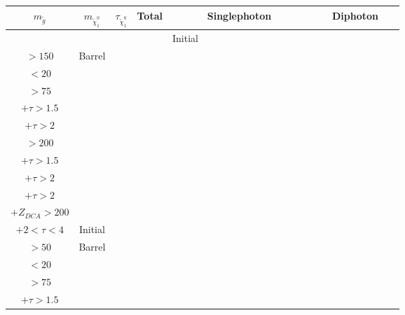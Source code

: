 \documentclass[8pt]{extarticle}
\begin{document}
\begin{longtable}{|c|c|c|c|c|c|c|c|c|c|c|c|c|c|c|c|c|c|c|c|c|c|c|c|c|}
\hline 
$m_{\tilde{g}}$ & $m_{\tilde{\chi}_1^0}$ & $\tau_{\tilde{\chi}_1^0}$ & Total & \multicolumn{12}{|c|}{Singlephoton} & \multicolumn{9}{|c|}{Diphoton} \\ 
\hline 
 & & & & Initial & \begin{tabular}{@{}c@{}} $p_T$ \\ $> 150$\end{tabular} & Barrel & \begin{tabular}{@{}c@{}} $E_T^{miss}$ \\ $< 20$\end{tabular} & \begin{tabular}{@{}c@{}} $E_T^{miss}$ \\ $> 75$\end{tabular} & \begin{tabular}{@{}c@{}} $E_T^{miss} > 75$ \\ $+ \tau > 1.5$ \end{tabular} & \begin{tabular}{@{}c@{}} $E_T^{miss} > 75$ \\ $+ \tau > 2$ \end{tabular} & \begin{tabular}{@{}c@{}} $E_T^{miss}$ \\ $> 200$\end{tabular} & \begin{tabular}{@{}c@{}} $E_T^{miss} > 200$ \\ $+ \tau > 1.5$ \end{tabular} & \begin{tabular}{@{}c@{}} $E_T^{miss} > 200$ \\ $+ \tau > 2$ \end{tabular} & \begin{tabular}{@{}c@{}} $E_T^{miss} > 200$ \\ $+ \tau > 2$ \\ $+Z_{DCA} > 200$\end{tabular} & \begin{tabular}{@{}c@{}} $E_{T}^{miss} > 200$ \\ $+ 2 < \tau < 4$ \end{tabular} & Initial & \begin{tabular}{@{}c@{}} $p_T$ \\ $> 50$\end{tabular} & Barrel & \begin{tabular}{@{}c@{}} $E_T^{miss}$ \\ $< 20$\end{tabular} & \begin{tabular}{@{}c@{}} $E_T^{miss}$ \\ $> 75$\end{tabular} & \begin{tabular}{@{}c@{}} $E_T^{miss} > 75$ \\ $+ \tau > 1.5$\end{tabular} & \begin{tabular}{@{}c@{}} $E_T^{miss} > 75$ 
\end{longtable}
\end{document}
